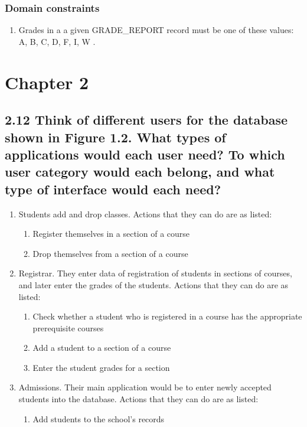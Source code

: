 \documentclass[11pt, oneside]{article}   	%
\begin{document}
\subsubsection*{Domain constraints}
\begin{enumerate}
\item Grades in a a given GRADE\_REPORT record must be one of these values: {A, B, C, D, F, I, W} .
\end{enumerate}

\section*{Chapter 2}
\subsection*{2.12 Think of different users for the database shown in Figure 1.2. What types of applications would each user need? To which user category would each belong, and what type of interface would each need?}

\begin{enumerate}

  \item Students add and drop classes. Actions that they can do are as listed:
    \begin{enumerate}
       \item Register themselves in a section of a course
       \item Drop themselves from a section of a course 
    \end{enumerate}
  \item Registrar. They enter data of registration of students in sections of courses, and later enter the grades of the students. Actions that they can do are as listed:
    \begin{enumerate}
        \item Check whether a student who is registered in a course has the appropriate prerequisite courses
       \item Add a student to a section of a course
       \item Enter the student grades for a section
    \end{enumerate}
  \item Admissions. Their main application would be to enter newly accepted students into the database. Actions that they can do are as listed:
    \begin{enumerate}
    	\item Add students to the school's records
    \end{enumerate}
\end{enumerate}
\end{document}
